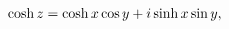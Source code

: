 \[\mathop{\cosh\/}\nolimits z=\mathop{\cosh\/}\nolimits x\mathop{\cos\/}%
\nolimits y+i\mathop{\sinh\/}\nolimits x\mathop{\sin\/}\nolimits y,\]